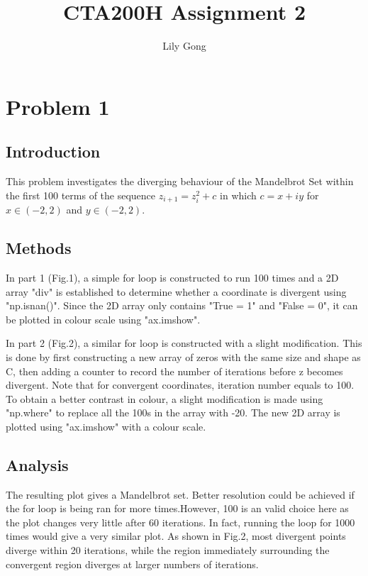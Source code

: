 \documentclass[apj]{emulateapj}
\begin{document}
\title{CTA200H Assignment 2}
 
\author{Lily Gong}
 
 

\section{Problem 1}
\label{sec:Problem 1}

\subsection{Introduction}
This problem investigates the diverging behaviour of the Mandelbrot Set within the first 100 terms of the sequence $z_{i+1} = z_i^2 + c$ in which $c = x + iy$ for $x\in(-2,2)$ and $y\in(-2,2)$.

\subsection{Methods}
\label{sec:Methods}
In part 1 (Fig.1), a simple for loop is constructed to run 100 times and a 2D array "div" is established to determine whether a coordinate is divergent using "np.isnan()". Since the 2D array only contains "True = 1" and "False = 0", it can be plotted in colour scale using "ax.imshow". 

In part 2 (Fig.2), a similar for loop is constructed with a slight modification. This is done by first constructing a new array of zeros with the same size and shape as C, then adding a counter to record the number of iterations before z becomes divergent. Note that for convergent coordinates, iteration number equals to 100. To obtain a better contrast in colour, a slight modification is made using "np.where" to replace all the 100s in the array with -20. The new 2D array is plotted using "ax.imshow" with a colour scale. 


\subsection{Analysis}
\label{sec:Analysis}
The resulting plot gives a Mandelbrot set. Better resolution could be achieved if the for loop is being ran for more times.However, 100 is an valid choice here as the plot changes very little after 60 iterations. In fact, running the loop for 1000 times would give a very similar plot. As shown in Fig.2, most divergent points diverge within 20 iterations, while the region immediately surrounding the convergent region diverges at larger numbers of iterations.
\end{document}
